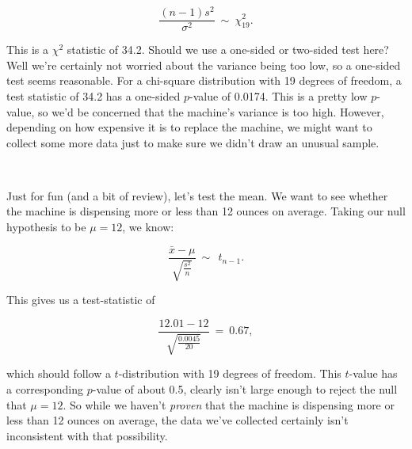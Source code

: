 \begin{equation*}

\frac{(n-1)s^2}{\sigma^2} \ \sim \  \chi^2_{19}.

\end{equation*}



This is a $\chi^2$ statistic of 34.2.  Should we use a one-sided or two-sided test here?  Well we're certainly not worried about the variance being too low, so a one-sided test seems reasonable.  For a chi-square distribution with 19 degrees of freedom, a test statistic of 34.2 has a one-sided $p$-value of 0.0174.  This is a pretty low $p$-value, so we'd be concerned that the machine's variance is too high.  However, depending on how expensive it is to replace the machine, we might want to collect some more data just to make sure we didn't draw an unusual sample.



~



Just for fun (and a bit of review), let's test the mean.  We want to see whether the machine is dispensing more or less than 12 ounces on average.  Taking our null hypothesis to be $\mu = 12$, we know:



\begin{equation*}

\frac{\bar{x}-\mu}{\sqrt{\frac{s^2}{n}}}\ \sim \  \ t_{n-1}.

\end{equation*}

This gives us a test-statistic of



\begin{equation*}

\frac{12.01 - 12}{\sqrt{\frac{0.0045}{20}}}\ = \ 0.67,

\end{equation*}

which should follow a $t$-distribution with 19 degrees of freedom.  This $t$-value has a corresponding $p$-value of about 0.5, clearly isn't large enough to reject the null that $\mu = 12$.  So while we haven't \emph{proven} that the machine is dispensing more or less than 12 ounces on average, the data we've collected certainly isn't inconsistent with that possibility.




